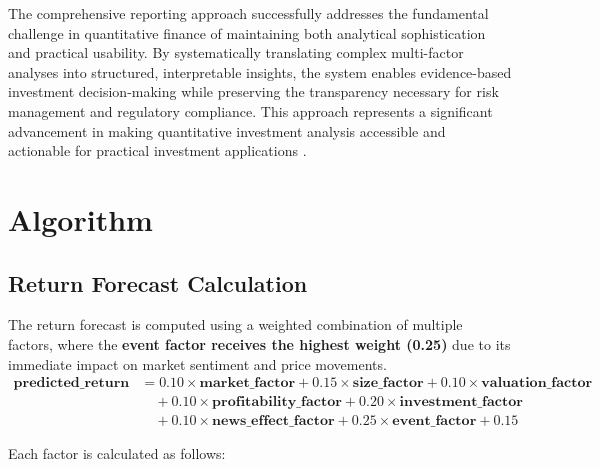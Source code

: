 \documentclass[3p,times,procedia]{elsarticle}
\begin{document}
The comprehensive reporting approach successfully addresses the fundamental challenge in quantitative finance of maintaining both analytical sophistication and practical usability. By systematically translating complex multi-factor analyses into structured, interpretable insights, the system enables evidence-based investment decision-making while preserving the transparency necessary for risk management and regulatory compliance. This approach represents a significant advancement in making quantitative investment analysis accessible and actionable for practical investment applications \cite{Harvey2016,Ribeiro2016}.

\vspace{0.20cm}
\section{Algorithm}

\subsection{Return Forecast Calculation}

The return forecast is computed using a weighted \allowbreak combination of multiple factors, where the \textbf{event factor receives the highest weight (0.25)} due to its immediate impact on market sentiment and price movements.
\begin{align}
\mathbf{predicted\_return} &= 0.10 \times \mathbf{market\_factor} + 0.15 \times \mathbf{size\_factor} + 0.10 \times \mathbf{valuation\_factor} \nonumber \\
&\quad + 0.10 \times \mathbf{profitability\_factor} + 0.20 \times \mathbf{investment\_factor} \nonumber \\
&\quad + 0.10 \times \mathbf{news\_effect\_factor} + \mathbf{0.25} \times \mathbf{event\_factor} + 0.15
\end{align}


Each factor is calculated as follows:
\end{document}
